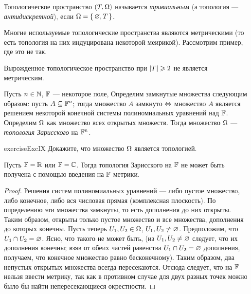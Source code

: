 \documentclass[main]{subfiles}
\begin{document}
\begin{definition}
	Топологическое пространство $(T, \Omega)$ называется \emph{тривиальным} (а топология --- \emph{антидискретной}),
	если $ \Omega = \left\{\, \varnothing, T \,\right\} $.
\end{definition}

Многие используемые топологические пространства являются метрическими (то есть топология на них индуцирована некоторой
меирикой). Рассмотрим пример, где это не так.

\begin{remark}
	Вырожденное топологическое пространство при $ \left\vert T\right\vert \geqslant 2 $ не является метрическим.
\end{remark}

\begin{definition}
	Пусть $ n \in \mathbb{N} $, $ \mathbb{F} $ --- некоторое поле, Определим замкнутые множества следующим образом:
	пусть $ A \subseteq \mathbb{F}^n $; тогда множество $ A $ замкнуто $\Leftrightarrow$ множество $ A $ является решением некоторой конечной
	системы полиномиальных уравнений над $ \mathbb{F} $. Определим $ \Omega $ как множество всех открытых множеств. Тогда
	множество $ \Omega $ --- \emph{топология Зарисского} на $ \mathbb{F}^n $.
\end{definition}

\begin{restatable}{exercise}{ExcIX}
	Докажите, что множество $ \Omega $ является топологией.
\end{restatable}

\begin{statement}
	Пусть $ \mathbb{F} = \mathbb{R} $ или $ \mathbb{F} = \mathbb{C} $. Тогда топология Зарисского на $ \mathbb{F} $ не может быть получена с помощью
	введения на $ \mathbb{F} $ метрики.
\end{statement}

\begin{proof}
	Решения систем полиномиальных уравнений --- либо пустое множество, либо конечное, либо вся числовая прямая
	(комплексная плоскость). По определению эти множества замкнуты, то есть дополнения до них открыты.
	Таким образом, открыты только пустое множество и все множества, дополнения до которых конечны.
	Пусть теперь $ U_1, U_2 \in \Omega $, $ U_1, U_2 \neq \varnothing $. Предположим, что $ U_1 \cap U_2 = \varnothing $. Ясно, что
	такого не может быть, (из $ U_1, U_2 \neq \varnothing $ следует, что их дополнения конечны; взяв от обеих частей равенства
	$ U_1 \cap U_2 = \varnothing $ дополнения, получаем, что конечное множество равно бесконечному).
	Таким образом, два непустых открытых множества всегда пересекаются. Отсюда следует, что на $ \mathbb{F} $ нельзя
	ввести метрику, так как в противном случае для двух разных точек можно было бы найти непересекающиеся окрестности.
\end{proof}
\end{document}
